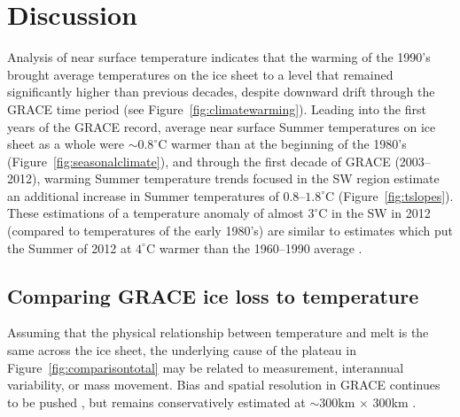 \documentclass[11pt]{report}
\begin{document}
\clearpage
\section{Discussion}


Analysis of near surface temperature indicates that the warming of the 1990's brought average temperatures on the ice sheet to a level that remained significantly higher than previous decades, despite downward drift through the GRACE time period (see Figure~\ref{fig:climatewarming}). Leading into the first years of the GRACE record, average near surface Summer temperatures on ice sheet as a whole were $\sim0.8^{\circ}$C warmer than at the beginning of the 1980's (Figure~\ref{fig:seasonalclimate}), and through the first decade of GRACE (2003--2012), warming Summer temperature trends focused in the SW region estimate an additional increase in Summer temperatures of $0.8$--$1.8^{\circ}$C (Figure~\ref{fig:tslopes}). These estimations of a temperature anomaly of almost $3^{\circ}$C in the SW in 2012 (compared to temperatures of the early 1980's) are similar to estimates which put the Summer of 2012 at $4^{\circ}$C warmer than the 1960--1990 average \cite[][]{angelen2014}.



\subsection{Comparing GRACE ice loss to temperature}
Assuming that the physical relationship between temperature and melt is the same across the ice sheet, the underlying cause of the plateau in Figure~\ref{fig:comparisontotal} may be related to measurement, interannual variability, or mass movement. Bias and spatial resolution in GRACE continues to be pushed \cite[see][]{Harig+2012,save2016,getraerSpring}, but remains conservatively estimated at $\sim300$km $\times$ $300$km \cite[][; Greenland itself is approximately $2700$km North--South $\times$ $1200$km East--West]{scanlon2016}. 
\end{document}
